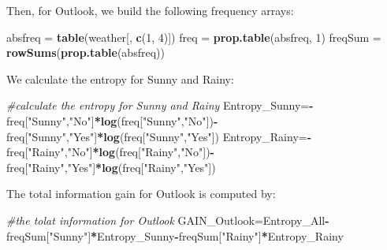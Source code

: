 \documentclass[]{article}
\newenvironment{Shaded}{\begin{snugshade}}{\end{snugshade}}
\newcommand{\CommentTok}[1]{\textcolor[rgb]{0.56,0.35,0.01}{\textit{#1}}}
\newcommand{\DecValTok}[1]{\textcolor[rgb]{0.00,0.00,0.81}{#1}}
\newcommand{\KeywordTok}[1]{\textcolor[rgb]{0.13,0.29,0.53}{\textbf{#1}}}
\newcommand{\NormalTok}[1]{#1}
\newcommand{\OperatorTok}[1]{\textcolor[rgb]{0.81,0.36,0.00}{\textbf{#1}}}
\newcommand{\StringTok}[1]{\textcolor[rgb]{0.31,0.60,0.02}{#1}}
\begin{document}
Then, for Outlook, we build the following frequency arrays:

\begin{Shaded}
\begin{Highlighting}[]
\NormalTok{absfreq =}\StringTok{ }\KeywordTok{table}\NormalTok{(weather[, }\KeywordTok{c}\NormalTok{(}\DecValTok{1}\NormalTok{, }\DecValTok{4}\NormalTok{)])}
\NormalTok{freq =}\StringTok{ }\KeywordTok{prop.table}\NormalTok{(absfreq, }\DecValTok{1}\NormalTok{)}
\NormalTok{freqSum =}\StringTok{ }\KeywordTok{rowSums}\NormalTok{(}\KeywordTok{prop.table}\NormalTok{(absfreq))}
\end{Highlighting}
\end{Shaded}

We calculate the entropy for Sunny and Rainy:

\begin{Shaded}
\begin{Highlighting}[]
\CommentTok{#calculate the entropy for Sunny and Rainy}
\NormalTok{Entropy_Sunny=}\OperatorTok{-}\NormalTok{freq[}\StringTok{"Sunny"}\NormalTok{,}\StringTok{"No"}\NormalTok{]}\OperatorTok{*}\KeywordTok{log}\NormalTok{(freq[}\StringTok{"Sunny"}\NormalTok{,}\StringTok{"No"}\NormalTok{])}\OperatorTok{-}\NormalTok{freq[}\StringTok{"Sunny"}\NormalTok{,}\StringTok{"Yes"}\NormalTok{]}\OperatorTok{*}\KeywordTok{log}\NormalTok{(freq[}\StringTok{"Sunny"}\NormalTok{,}\StringTok{"Yes"}\NormalTok{])}
\NormalTok{Entropy_Rainy=}\OperatorTok{-}\NormalTok{freq[}\StringTok{"Rainy"}\NormalTok{,}\StringTok{"No"}\NormalTok{]}\OperatorTok{*}\KeywordTok{log}\NormalTok{(freq[}\StringTok{"Rainy"}\NormalTok{,}\StringTok{"No"}\NormalTok{])}\OperatorTok{-}\NormalTok{freq[}\StringTok{"Rainy"}\NormalTok{,}\StringTok{"Yes"}\NormalTok{]}\OperatorTok{*}\KeywordTok{log}\NormalTok{(freq[}\StringTok{"Rainy"}\NormalTok{,}\StringTok{"Yes"}\NormalTok{])}
\end{Highlighting}
\end{Shaded}

The total information gain for Outlook is computed by:

\begin{Shaded}
\begin{Highlighting}[]
\CommentTok{#the tolat information for Outlook }
\NormalTok{GAIN_Outlook=Entropy_All}\OperatorTok{-}\NormalTok{freqSum[}\StringTok{"Sunny"}\NormalTok{]}\OperatorTok{*}\NormalTok{Entropy_Sunny}\OperatorTok{-}\NormalTok{freqSum[}\StringTok{"Rainy"}\NormalTok{]}\OperatorTok{*}\NormalTok{Entropy_Rainy}
\end{Highlighting}
\end{Shaded}
\end{document}
